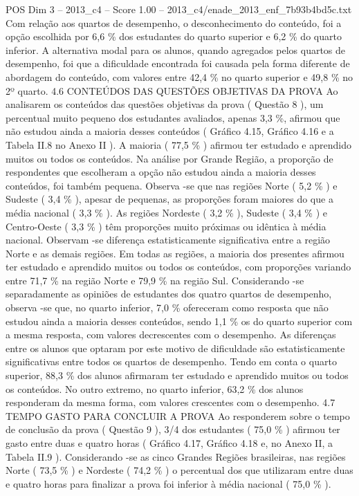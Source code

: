 \begin{textsample}{POS Dim 3 – 2013\_c4 – Score 1.00 – 2013\_c4/enade\_2013\_enf\_7b93b4bd5c.txt}
Com relação aos quartos de desempenho, o desconhecimento do conteúdo, foi a opção escolhida por 6,6 \% dos estudantes do quarto superior e 6,2 \% do quarto inferior.
A alternativa modal para os alunos, quando agregados pelos quartos de desempenho, foi que a dificuldade encontrada foi causada pela forma diferente de abordagem do conteúdo, com valores entre 42,4 \% no quarto superior e 49,8 \% no 2º quarto. 4.6 CONTEÚDOS DAS QUESTÕES OBJETIVAS DA PROVA Ao analisarem os conteúdos das questões objetivas da prova ( Questão 8 ), um percentual muito pequeno dos estudantes avaliados, apenas 3,3 \%, afirmou que não estudou ainda a maioria desses conteúdos ( Gráfico 4.15, Gráfico 4.16 e a Tabela II.8 no Anexo II ).
A maioria ( 77,5 \% ) afirmou ter estudado e aprendido muitos ou todos os conteúdos.
Na análise por Grande Região, a proporção de respondentes que escolheram a opção não estudou ainda a maioria desses conteúdos, foi também pequena.
Observa -se que nas regiões Norte ( 5,2 \% ) e Sudeste ( 3,4 \% ), apesar de pequenas, as proporções foram maiores do que a média nacional ( 3,3 \% ).
As regiões Nordeste ( 3,2 \% ), Sudeste ( 3,4 \% ) e Centro-Oeste ( 3,3 \% ) têm proporções muito próximas ou idêntica à média nacional.
Observam -se diferença estatisticamente significativa entre a região Norte e as demais regiões.
Em todas as regiões, a maioria dos presentes afirmou ter estudado e aprendido muitos ou todos os conteúdos, com proporções variando entre 71,7 \% na região Norte e 79,9 \% na região Sul.
Considerando -se separadamente as opiniões de estudantes dos quatro quartos de desempenho, observa -se que, no quarto inferior, 7,0 \% ofereceram como resposta que não estudou ainda a maioria desses conteúdos, sendo 1,1 \% os do quarto superior com a mesma resposta, com valores decrescentes com o desempenho.
As diferenças entre os alunos que optaram por este motivo de dificuldade são estatisticamente significativas entre todos os quartos de desempenho.
Tendo em conta o quarto superior, 88,3 \% dos alunos afirmaram ter estudado e aprendido muitos ou todos os conteúdos.
No outro extremo, no quarto inferior, 63,2 \% dos alunos responderam da mesma forma, com valores crescentes com o desempenho. 4.7 TEMPO GASTO PARA CONCLUIR A PROVA Ao responderem sobre o tempo de conclusão da prova ( Questão 9 ), 3/4 dos estudantes ( 75,0 \% ) afirmou ter gasto entre duas e quatro horas ( Gráfico 4.17, Gráfico 4.18 e, no Anexo II, a Tabela II.9 ).
Considerando -se as cinco Grandes Regiões brasileiras, nas regiões Norte ( 73,5 \% ) e Nordeste ( 74,2 \% ) o percentual dos que utilizaram entre duas e quatro horas para finalizar a prova foi inferior à média nacional ( 75,0 \% ).

\end{textsample}
